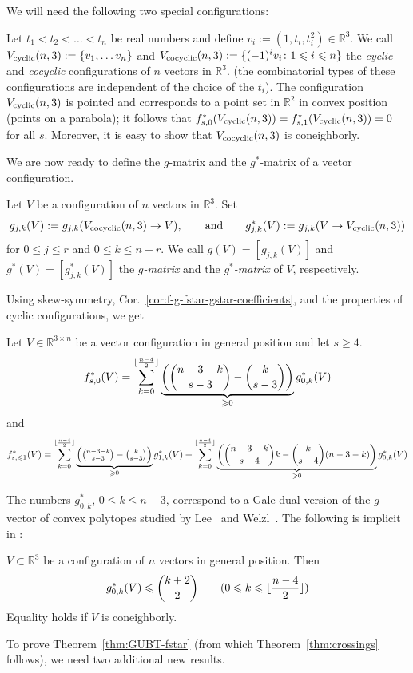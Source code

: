 \documentclass[a4paper,USenglish,cleveref, autoref, thm-restate,nolineno]{socg-lipics-v2021}
\renewcommand{\leq}{\leqslant}
\renewcommand{\geq}{\geqslant}
\newcommand{\R}{\mathbb{R}}
\DeclarePairedDelimiter\floor{\lfloor}{\rfloor}
\newcommand{\cyclic}{V_{\textup{cyclic}}}
\newcommand{\cocyclic}{V_{\textup{cocyclic}}}
\begin{document}
We will need the following two special configurations: 
\begin{example}
\label{ex:cyclic-cocyclic}
Let $t_1<t_2<\dots<t_n$ be real numbers and define $v_i:= (1,t_i,t_i^2) \in \R^3$. We call $\cyclic(n,3):=\{v_1,\dots v_n\}$ and $\cocyclic(n,3):=\{(-1)^i v_i\colon 1\leq i\leq n\}$ the \emph{cyclic} and \emph{cocyclic} configurations of $n$ vectors in $\R^3$.
 (the combinatorial types of these configurations are independent of the choice of the $t_i$). 
 The configuration $\cyclic(n,3)$ is pointed and corresponds to a point set in $\R^2$ in convex position (points on a parabola); it follows that $f^*_{s,0}(\cyclic(n,3))=f^*_{s,1}(\cyclic(n,3))=0$ for all $s$. Moreover, it is easy to show \cite[Lemma~3.5.1]{Matousek:2003aa} that 
$\cocyclic(n,3)$ is coneighborly.
\end{example}
We are now ready to define the $g$-matrix and the $g^*$-matrix of a vector configuration.
\begin{definition}
\label{def:g-matrix}
Let $V$ be a configuration of $n$ vectors in $\mathbb{R}^3$. Set 
\[
g_{j,k} (V) := g_{j,k} (\cocyclic(n,3) \to V), \qquad\textrm{and}\qquad g^*_{j,k} (V) := g_{j,k} (V \to \cyclic(n,3))
\]
for $0\leq j\leq r$ and $0\leq k\leq n-r$. We call $g(V)=[g_{j,k}(V)]$ and $g^*(V)=[g^*_{j,k}(V)]$ the \emph{$g$-matrix} and the \emph{$g^*$-matrix} of $V$, respectively.
\end{definition}

Using skew-symmetry, Cor.~\ref{cor:f-g-fstar-gstar-coefficients}, and the properties of cyclic configurations, we get 
\begin{lemma} 
\label{lem:fstar-gstar-b1}
Let $V\in \R^{3\times n}$ be a vector configuration in general position and let $s\geq 4$. 
\[
f_{s,0}^*(V) = \sum_{k=0}^{\floor{\frac{n-4}{2}}}\underbrace{\left( \binom{n-3-k}{s-3}-\binom{k}{s-3}\right)}_{\geq 0}  g^*_{0,k}(V)
\]
and
\[
f^*_{s,\leq 1}(V) = \sum_{k=0}^{\floor{\frac{n-4}{2}}} \underbrace{\textstyle \left( \binom{n-3-k}{s-3}-\binom{k}{s-3}\right)}_{\geq 0}  g^*_{1,k}(V) +  \sum_{k=0}^{\floor{\frac{n-4}{2}}} \underbrace{\left( \binom{n-3-k}{s-4} k - \binom{k}{s-4} (n-3-k) \right)}_{\geq 0}  g^*_{0,k}(V) 
\]
\end{lemma}
The numbers $g^*_{0,k}$, $0\leq k\leq n-3$, correspond to a Gale dual version of the $g$-vector of convex polytopes studied by Lee~\cite{Lee:1991aa} and Welzl~\cite{Welzl:2001aa}. The following is implicit in 
 \cite[Sec.~4]{Welzl:2001aa}:
 \begin{theorem} $V \subset \R^3$ be a configuration of $n$ vectors in general position. Then
 \label{thm:g-star-welzl}
\[g^*_{0,k}(V) \leq  \binom{k+2}{2}\qquad (0\leq k\leq \floor{\frac{n-4}{2}})\]
Equality holds if $V$ is coneighborly.
\end{theorem}
To prove Theorem~\ref{thm:GUBT-fstar} (from which Theorem~\ref{thm:crossings} follows), we need two additional new results.
\end{document}
